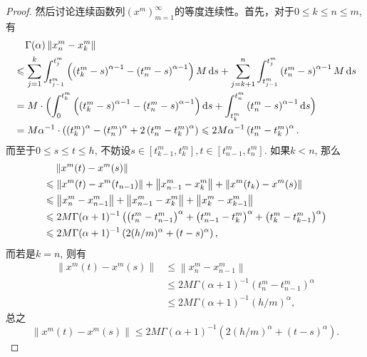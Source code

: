 \begin{proof}
    然后讨论连续函数列$\left(x^m\right)_{m=1}^\infty$的等度连续性。首先，对于$0\leqslant k\leqslant n\leqslant m$, 有
    \begin{align*}
        &\relphantom{\leqslant}\Gamma(\alpha)\left\| x^m_n-x^m_k \right\|
        \\ &\leqslant \sum_{j=1}^{k}\int_{t^m_{j-1}}^{t^m_j}\left(\left(t^m_k-s\right)^{\alpha-1}-\left(t^m_n-s\right)^{\alpha-1}\right)M\differential s+\sum_{j=k+1}^{n}\int_{t^m_{j-1}}^{t^m_j}\left(t^m_n-s\right)^{\alpha-1}M\differential s
        \\ &=M\cdot\Bigl(\int_{0}^{t^m_k}\left(\left(t^m_k-s\right)^{\alpha-1}-\left(t^m_n-s\right)^{\alpha-1}\right)\differential s+\int_{t^m_k}^{t^m_n}\left(t^m_n-s\right)^{\alpha-1}\differential s\Bigr)
        \\ &=M\alpha^{-1}\cdot \left(\left(t^m_k\right) ^\alpha-\left(t^m_n\right)^\alpha+2\left(t^m_n-t^m_k\right)^\alpha\right)\leqslant 2M\alpha^{-1}\left(t^m_n-t^m_k\right)^\alpha.
    \end{align*}
    而至于$0\leqslant s\leqslant t\leqslant h$, 不妨设$s\in\left[t^m_{k-1},t^m_k\right],t\in\left[t^m_{n-1},t^m_n\right]$. 如果$k<n$, 那么
    \begin{align*}
        &\relphantom{\leqslant}\left\| x^m(t)-x^m(s) \right\|
        \\ &\leqslant \left\| x^m(t)-x^m(t_{n-1}) \right\|+\left\| x^m_{n-1}-x^m_k \right\|+\left\| x^m(t_k)-x^m(s) \right\|
        \\ &\leqslant \left\|x^m_{n}-x^m_{n-1}\right\|+\left\| x^m_{n-1}-x^m_k \right\|+\left\|x^m_{k}-x^m_{k-1}\right\|
        \\ &\leqslant 2M\Gamma(\alpha+1)^{-1}\left(\left(t^m_n-t^m_{n-1}\right)^\alpha + \left( t^m_{n-1}-t^m_{k}\right)^\alpha + \left(t^m_k-t^m_{k-1}\right)^\alpha\right)
        \\ &\leqslant 2M\Gamma(\alpha+1)^{-1}\left(2(h/m)^\alpha+(t-s)^\alpha\right),
    \end{align*}
    而若是$k=n$, 则有
    \begin{align*}
        \left\| x^m(t)-x^m(s) \right\| &\leqslant \left\|x^m_{n}-x^m_{n-1}\right\|
        \\ &\leqslant 2M\Gamma(\alpha+1)^{-1}\left(t^m_n-t^m_{n-1}\right)^\alpha
        \\ &\leqslant 2M\Gamma(\alpha+1)^{-1}(h/m)^\alpha,
    \end{align*}
    总之
    \begin{equation}\label{xmts}
        \left\| x^m(t)-x^m(s) \right\| \leqslant 2M\Gamma(\alpha+1)^{-1}\left(2(h/m)^\alpha+(t-s)^\alpha\right).

\end{equation}
\end{proof}
